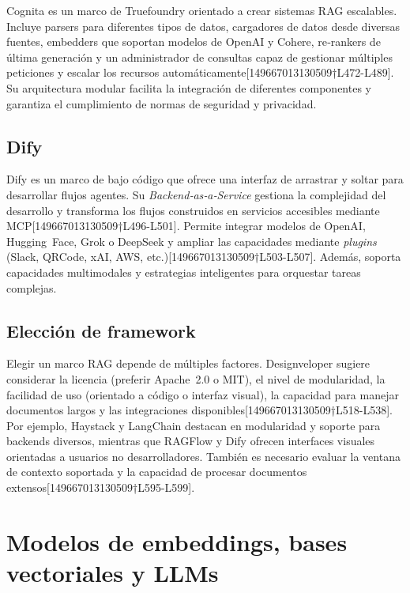 Cognita es un marco de Truefoundry orientado a crear sistemas RAG escalables.  Incluye parsers para diferentes tipos de datos, cargadores de datos desde diversas fuentes, embedders que soportan modelos de OpenAI y Cohere, re‑rankers de última generación y un administrador de consultas capaz de gestionar múltiples peticiones y escalar los recursos automáticamente[149667013130509†L472-L489].  Su arquitectura modular facilita la integración de diferentes componentes y garantiza el cumplimiento de normas de seguridad y privacidad.

\subsection{Dify}

Dify es un marco de bajo código que ofrece una interfaz de arrastrar y soltar para desarrollar flujos agentes.  Su \textit{Backend‑as‑a‑Service} gestiona la complejidad del desarrollo y transforma los flujos construidos en servicios accesibles mediante MCP[149667013130509†L496-L501].  Permite integrar modelos de OpenAI, Hugging Face, Grok o DeepSeek y ampliar las capacidades mediante \textit{plugins} (Slack, QRCode, xAI, AWS, etc.)[149667013130509†L503-L507].  Además, soporta capacidades multimodales y estrategias inteligentes para orquestar tareas complejas.

\subsection{Elección de framework}

Elegir un marco RAG depende de múltiples factores.  Designveloper sugiere considerar la licencia (preferir Apache 2.0 o MIT), el nivel de modularidad, la facilidad de uso (orientado a código o interfaz visual), la capacidad para manejar documentos largos y las integraciones disponibles[149667013130509†L518-L538].  Por ejemplo, Haystack y LangChain destacan en modularidad y soporte para backends diversos, mientras que RAGFlow y Dify ofrecen interfaces visuales orientadas a usuarios no desarrolladores.  También es necesario evaluar la ventana de contexto soportada y la capacidad de procesar documentos extensos[149667013130509†L595-L599].

\section{Modelos de embeddings, bases vectoriales y LLMs}

